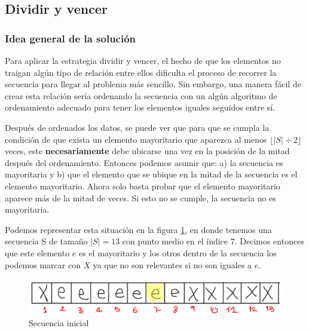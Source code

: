 \documentclass[letter]{article}
\begin{document}
\newpage

\subsection{Dividir y vencer} \label{algoritmos:dividir}

\subsubsection{Idea general de la solución} \label{algoritmos:dividir:idea}

Para aplicar la estrategia dividir y vencer, el hecho de que los elementos no traigan algún tipo de relación entre ellos dificulta el proceso de recorrer la secuencia para llegar al problema más sencillo. Sin embargo, una manera fácil de crear esta relación sería ordenando la secuencia con un algún algoritmo de ordenamiento adecuado para tener los elementos iguales seguidos entre sí. \par

Después de ordenados los datos, se puede ver que para que se cumpla la condición de que exista un elemento mayoritario que aparezca al menos $\lfloor |S| \div 2 \rfloor$ veces, este \textbf{necesariamente} debe ubicarse una vez en la posición de la mitad después del ordenamiento. Entonces podemos asumir que: a) la secuencia es mayoritaria y b) que el elemento que se ubique en la mitad de la secuencia es el elemento mayoritario. Ahora solo basta probar que el elemento mayoritario aparece más de la mitad de veces. Si esto no se cumple, la secuencia no es mayoritaria. \par

Podemos representar esta situación en la figura \ref{fig:secuencia_inicial}, en donde tenemos una secuencia S de tamaño $|S|=13$ con punto medio en el índice $7$. Decimos entonces que este elemento $e$ es el mayoritario y los otros dentro de la secuencia los podemos marcar con $X$ ya que no son relevantes si no son iguales a $e$.

\begin{figure}[!ht]
\centering
\includegraphics[scale=0.2]{img/fig1.png}
\vspace{-1em}
\caption{Secuencia inicial}
\label{fig:secuencia_inicial}
\end{figure}
\end{document}
